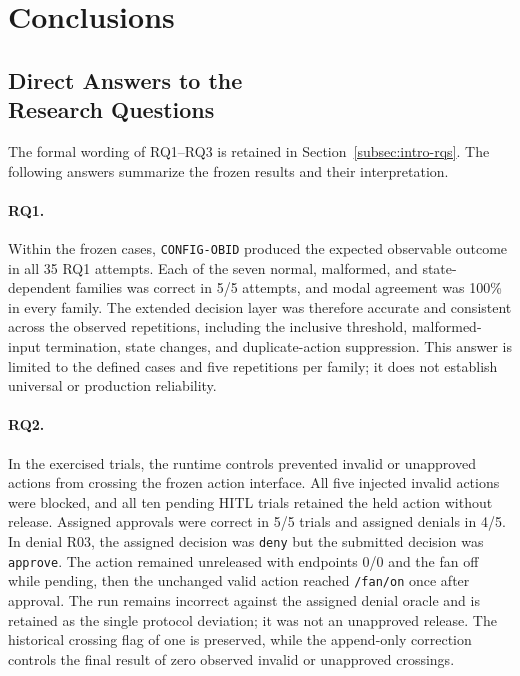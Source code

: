 \section{Conclusions}\label{sec:conclusions}

\subsection[Direct Answers to the Research Questions]{Direct Answers to the\\Research Questions}\label{subsec:conclusions-rqs}

The formal wording of RQ1--RQ3 is retained in
Section~\ref{subsec:intro-rqs}. The following answers summarize the frozen
results and their interpretation.

\paragraph{RQ1.}
Within the frozen cases, \texttt{CONFIG-OBID} produced the expected observable
outcome in all 35 RQ1 attempts. Each of the seven normal, malformed, and
state-dependent families was correct in 5/5 attempts, and modal agreement was
100\% in every family. The extended decision layer was therefore accurate and
consistent across the observed repetitions, including the inclusive threshold,
malformed-input termination, state changes, and duplicate-action suppression.
This answer is limited to the defined cases and five repetitions per family; it
does not establish universal or production reliability.

\paragraph{RQ2.}
In the exercised trials, the runtime controls prevented invalid or unapproved
actions from crossing the frozen action interface. All five injected invalid
actions were
blocked, and all ten pending HITL trials retained the held action without
release. Assigned approvals were correct in 5/5 trials and assigned denials in
4/5. In denial R03, the assigned decision was \texttt{deny} but the submitted
decision was \texttt{approve}. The action remained unreleased with endpoints
0/0 and the fan off while pending, then the unchanged valid action reached
\texttt{/fan/on} once after approval. The run remains incorrect against the
assigned denial oracle and is retained as the single protocol deviation; it was
not an unapproved release. The historical crossing flag of
one is preserved, while the append-only correction controls the final result of
zero observed invalid or unapproved crossings.

